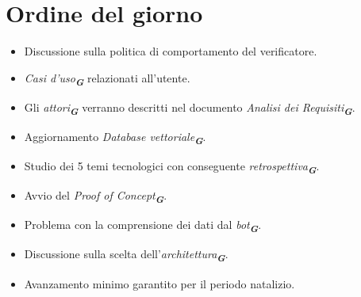 

\section{Ordine del giorno}

\begin{itemize}
    \item Discussione sulla politica di comportamento del verificatore.
    \item \emph{Casi d'uso}\textsubscript{\textit{\textbf{G}}} relazionati all'utente.
    \item Gli \emph{attori}\textsubscript{\textit{\textbf{G}}} verranno descritti nel documento \emph{Analisi dei Requisiti}\textsubscript{\textit{\textbf{G}}}.
    \item Aggiornamento \emph{Database vettoriale}\textsubscript{\textit{\textbf{G}}}.
    \item Studio dei 5 temi tecnologici con conseguente \emph{retrospettiva}\textsubscript{\textit{\textbf{G}}}.
    \item Avvio del \emph{Proof of Concept}\textsubscript{\textit{\textbf{G}}}.
    \item Problema con la comprensione dei dati dal \emph{bot}\textsubscript{\textit{\textbf{G}}}.
    \item Discussione sulla scelta dell'\emph{architettura}\textsubscript{\textit{\textbf{G}}}.
    \item Avanzamento minimo garantito per il periodo natalizio.
\end{itemize}
